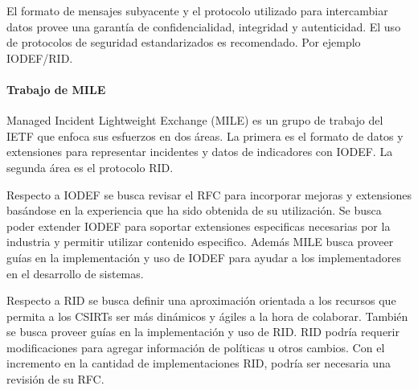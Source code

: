 El formato de mensajes subyacente y el protocolo utilizado para intercambiar 
datos provee una garantía de confidencialidad, integridad y autenticidad. El uso 
de protocolos de seguridad estandarizados es recomendado. Por ejemplo 
IODEF/RID.

\paragraph{Trabajo de MILE}

Managed Incident Lightweight Exchange (MILE) es un grupo de trabajo del IETF que 
enfoca sus esfuerzos en dos áreas. La primera es el formato de datos y 
extensiones para representar incidentes y datos de indicadores con IODEF. La segunda área 
es el protocolo RID.

Respecto a IODEF se busca revisar el RFC para incorporar mejoras y extensiones 
basándose en la experiencia que ha sido obtenida de su utilización. Se busca poder extender IODEF para 
soportar extensiones especificas necesarias por la industria y permitir utilizar 
contenido especifico. Además MILE busca proveer guías en la implementación y uso 
de IODEF para ayudar a los implementadores en el desarrollo de sistemas.

Respecto a RID se busca definir una aproximación orientada a los recursos que 
permita a los CSIRTs ser más dinámicos y ágiles a la hora de colaborar. También 
se busca proveer guías en la implementación y uso de RID. RID podría requerir 
modificaciones para agregar información de políticas u otros cambios. Con el 
incremento en la cantidad de implementaciones RID, podría ser necesaria una 
revisión de su RFC.


